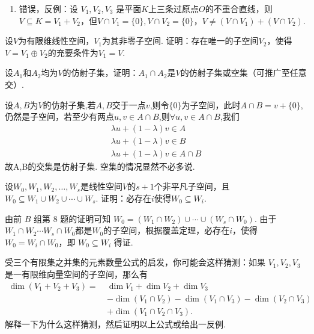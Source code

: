 \begin{exercise}
\begin{exgroup}
\begin{answer}
\begin{enumerate}
              \item 错误，反例：设 $V_1,V_2,V_3$ 是平面$K$上三条过原点$O$的不重合直线，则$V\subseteq K=V_1+V_2$，但$V\cap V_1=\{0\},V\cap V_2=\{0\}$，$V\ne (V\cap V_1)+(V\cap V_2)$.
          \end{enumerate}
        \end{answer}
        \item 设$V$为有限维线性空间，$V_1$为其非零子空间. 证明：存在唯一的子空间$V_2$，使得$V=V_1\oplus V_2$的充要条件为$V_1=V$.
        \begin{answer}

        \end{answer}

       \item 设$A_1$和$A_2$均为$V$的仿射子集，证明：$A_1\cap A_2$是$V$的仿射子集或空集（可推广至任意交）.
       \begin{answer}
        设$A,B$为$V$的仿射子集,若$A,B$交于一点$v$,则令$\{0\}$为子空间，此时$A \cap B = v+\{0\} $,仍然是子空间，若至少有两点$u,v \in A \cap B$,则$ \forall u,v \in A \cap B$,我们
        \begin{align*}
         \lambda u + (1-\lambda)v \in A \\
            \lambda u + (1-\lambda)v \in B\\
            \lambda u + (1-\lambda)v \in A \cap B
        \end{align*}
       故A,B的交集是仿射子集.
       空集的情况显然不必多说.
       \end{answer}
    \end{exgroup}

    \begin{exgroup}
        \item 设$W_0,W_1,W_2,\ldots,W_s$是线性空间$V$的$s+1$个非平凡子空间，且$W_0 \subseteq W_1 \cup W_2 \cup \cdots \cup W_s$. 证明：必存在$i$使得$W_0\subseteq W_i$.
        \begin{answer}
            由前 $B$ 组第 8 题的证明可知 $W_0=(W_1\cap W_2)\cup\cdots\cup(W_s\cap W_0)$. 由于$W_1\cap W_2\cdots W_s\cap W_0$都是$W_0$的子空间，根据覆盖定理，必存在$i$，使得$W_0=W_i\cap W_0$，即 $W_0\subseteq W_i$ 得证.
        \end{answer}

        \item 受三个有限集之并集的元素数量公式的启发，你可能会这样猜测：如果 $V_1,V_2,V_3$ 是一有限维向量空间的子空间，那么有
        \begin{align*}
            \dim(V_1+V_2+V_3) =\ &\dim V_1+\dim V_2+\dim V_3 \\
            &-\dim(V_1\cap V_2)-\dim(V_1\cap V_3)-\dim(V_2\cap V_3) \\
            &+\dim(V_1\cap V_2\cap V_3).
        \end{align*}
        解释一下为什么这样猜测，然后证明以上公式或给出一反例.
        \begin{answer}


\end{answer}
\end{exgroup}
\end{exercise}
